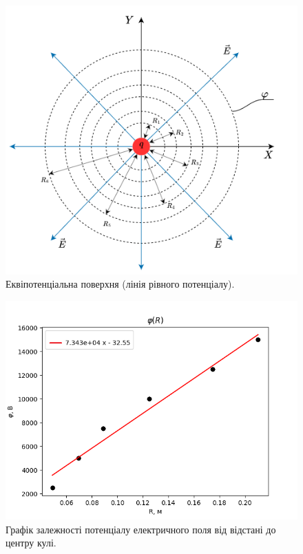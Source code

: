 \documentclass[a4paper,12pt]{article}
\begin{document}
	\begin{figure}[h!]
		\centering
		\begin{minipage}[h]{1\linewidth}
			\includegraphics[width=1\linewidth]{Prt sc/Figure_2_1.png}
			\caption{Еквіпотенціальна поверхня  (лінія рівного потенціалу).}
			\label{Figure_2}
		\end{minipage}
	\end{figure}

\newpage
	\begin{figure}[h!]
		\centering
		\begin{minipage}[h]{1\linewidth}
			\includegraphics[width=1\linewidth]{Prt sc/Figure_1.png}
			\caption{Графік залежності потенціалу електричного поля від відстані до центру кулі.}
			\label{Figure_1}
		\end{minipage}
	\end{figure}
	
\end{document}
